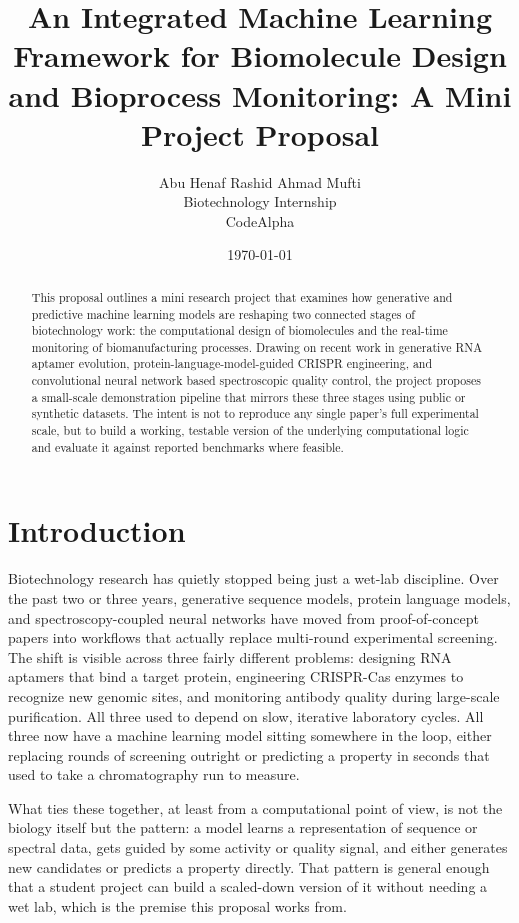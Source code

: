 \documentclass[11pt,a4paper]{article}
\title{\textbf{An Integrated Machine Learning Framework for Biomolecule Design and Bioprocess Monitoring: A Mini Project Proposal}}
\author{Abu Henaf Rashid Ahmad Mufti \\ Biotechnology Internship \\ CodeAlpha}
\date{\today}
\begin{document}
\maketitle

\begin{abstract}
\noindent This proposal outlines a mini research project that examines how generative and predictive machine learning models are reshaping two connected stages of biotechnology work: the computational design of biomolecules and the real-time monitoring of biomanufacturing processes. Drawing on recent work in generative RNA aptamer evolution, protein-language-model-guided CRISPR engineering, and convolutional neural network based spectroscopic quality control, the project proposes a small-scale demonstration pipeline that mirrors these three stages using public or synthetic datasets. The intent is not to reproduce any single paper's full experimental scale, but to build a working, testable version of the underlying computational logic and evaluate it against reported benchmarks where feasible.
\end{abstract}

\section{Introduction}

Biotechnology research has quietly stopped being just a wet-lab discipline. Over the past two or three years, generative sequence models, protein language models, and spectroscopy-coupled neural networks have moved from proof-of-concept papers into workflows that actually replace multi-round experimental screening. The shift is visible across three fairly different problems: designing RNA aptamers that bind a target protein, engineering CRISPR-Cas enzymes to recognize new genomic sites, and monitoring antibody quality during large-scale purification. All three used to depend on slow, iterative laboratory cycles. All three now have a machine learning model sitting somewhere in the loop, either replacing rounds of screening outright or predicting a property in seconds that used to take a chromatography run to measure.

What ties these together, at least from a computational point of view, is not the biology itself but the pattern: a model learns a representation of sequence or spectral data, gets guided by some activity or quality signal, and either generates new candidates or predicts a property directly. That pattern is general enough that a student project can build a scaled-down version of it without needing a wet lab, which is the premise this proposal works from.
\end{document}
